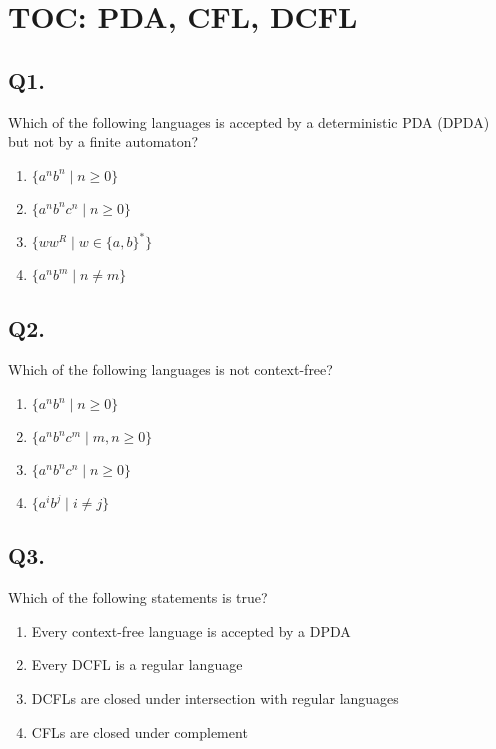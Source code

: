 \section{TOC: PDA, CFL, DCFL}

\subsection*{Q1.}
Which of the following languages is accepted by a deterministic PDA (DPDA) but not by a finite automaton?

\begin{enumerate}[label=(\alph*)]
    \item $\{a^n b^n \mid n \geq 0\}$  
    \item $\{a^n b^n c^n \mid n \geq 0\}$  
    \item $\{w w^R \mid w \in \{a, b\}^*\}$  
    \item $\{a^n b^m \mid n \neq m\}$  
\end{enumerate}

\vspace{1em}

\subsection*{Q2.}
Which of the following languages is not context-free?

\begin{enumerate}[label=(\alph*)]
    \item $\{a^n b^n \mid n \geq 0\}$  
    \item $\{a^n b^n c^m \mid m, n \geq 0\}$  
    \item $\{a^n b^n c^n \mid n \geq 0\}$  
    \item $\{a^i b^j \mid i \neq j\}$  
\end{enumerate}

\vspace{1em}

\subsection*{Q3.}
Which of the following statements is true?

\begin{enumerate}[label=(\alph*)]
    \item Every context-free language is accepted by a DPDA  
    \item Every DCFL is a regular language  
    \item DCFLs are closed under intersection with regular languages  
    \item CFLs are closed under complement  
\end{enumerate}

